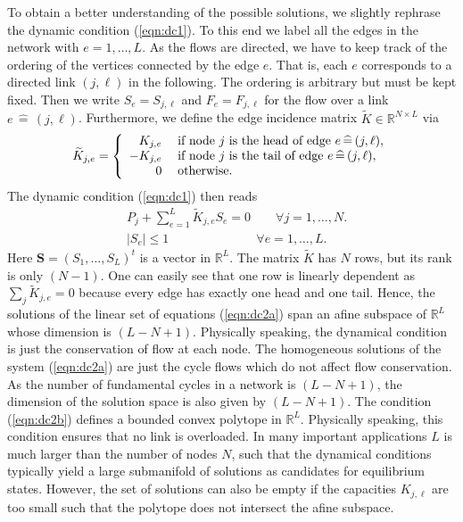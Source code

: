 \documentclass[10pt,aps,pre,preprint,superscriptaddress]{revtex4-1}
\newcommand{\be}{\begin{equation}}
\newcommand{\ee}{\end{equation}}
\renewcommand{\vec}[1]{\boldsymbol{#1}}
\begin{document}
To obtain a better understanding of the possible solutions,
we slightly rephrase the dynamic condition  (\ref{eqn:dc1}).
To this end we label all the edges in the network with $e = 1,\ldots,L$.
As the flows are directed, we have to keep track of the ordering
of the vertices connected by the edge $e$. That is, each $e$ 
corresponds to a directed link $(j,\ell)$ in the following. The ordering
is arbitrary but must be kept fixed.
Then we write $S_e = S_{j,\ell}$ and $F_e = F_{j,\ell}$
for the flow over a link $e  \,  \widehat= \, (j,\ell)$. 
Furthermore, we define the edge incidence matrix
$\widetilde K \in \mathbb{R}^{N\times L}$ \cite{Newm10} via
\be
   \widetilde K _{j,e} = \left\{
   \begin{array}{r l }
      K_{j,e} & \; \mbox{if node $j$ is the head of edge $e  \,  \widehat= \, (j,\ell)$},  \\
      - K_{j,e} & \; \mbox{if node $j$ is the tail of edge $e  \,  \widehat= \, (j,\ell)$},  \\
      0     & \; \mbox{otherwise}.
  \end{array} \right.
\ee
The dynamic condition (\ref{eqn:dc1}) then reads
\begin{subequations}
\label{eqn:dc2}
\begin{align}
   & P_j + \sum_{e=1}^L \widetilde K _{j,e} S_e = 0 \qquad 
              \forall j=1,\ldots,N. 
     \label{eqn:dc2a}  \\
  &  |S_{e}|   \le 1 \quad \qquad \qquad \qquad  
              \forall e = 1,\ldots,L.
  \label{eqn:dc2b}
\end{align} 
\end{subequations}
Here $\vec S = (S_1,\ldots,S_L)^t$ is a vector in $\mathbb{R}^L$.
The matrix $\widetilde K$ has $N$ rows, but its rank is only $(N-1)$.
One can easily see that one row is linearly dependent as 
$\sum  \nolimits_j \widetilde K_{j,e} = 0$ because every edge 
has exactly one head and one tail. Hence, the solutions 
of the linear set of equations (\ref{eqn:dc2a}) span an afine 
subspace of $\mathbb{R}^L$ whose dimension  is $(L-N+1)$. 
Physically speaking, the dynamical condition is just the
conservation of flow at each node. The homogeneous 
solutions of the system (\ref{eqn:dc2a}) are just the cycle
flows which do not affect flow conservation. As the number
of fundamental cycles in a network is  $(L-N+1)$, the dimension
of the solution space is also given by $(L-N+1)$.
The condition (\ref{eqn:dc2b}) defines a bounded convex 
polytope in $\mathbb{R}^L$. Physically speaking, this condition
ensures that no link is overloaded. 
In many important applications $L$ is much larger than 
the number of nodes $N$, such that the dynamical
conditions typically yield a large submanifold of solutions
as candidates for equilibrium states. However, the set of
solutions can also be empty if the capacities $K_{j,\ell}$
are too small such that the polytope does not intersect
the afine subspace.
  
\end{document}
